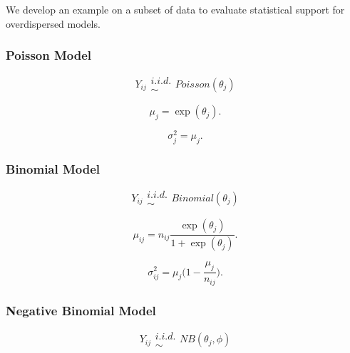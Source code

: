 \documentclass[12pt]{article}
\begin{document}
We develop an example on a subset of data to evaluate statistical support for
overdispersed models. 





%
\subsubsection{Poisson Model}

%
\begin{equation}
Y_{ij} \substack{i.i.d.\\\sim} Poisson(\theta_{j})
\end{equation}

\begin{equation}
\mu_{j} = \exp(\theta_{j}). %
\end{equation}

\begin{equation}
\sigma^2_{j} = \mu_{j}.
\end{equation}


%
\subsubsection{Binomial Model}

%
\begin{equation}
Y_{ij} \substack{i.i.d.\\\sim} Binomial(\theta_{j})
\end{equation}

\begin{equation}
\mu_{ij} = n_{ij}\frac{\exp(\theta_{j})}{1+\exp(\theta_{j})}.
\end{equation}

%
\begin{equation}
\sigma^2_{ij} = \mu_{j}\Big(1-\frac{\mu_{j}}{n_{ij}}\Big).
\end{equation}

%
\subsubsection{Negative Binomial Model}

%
\begin{equation}
Y_{ij} \substack{i.i.d.\\\sim} NB(\theta_{j}, \phi)
\end{equation}
\end{document}
